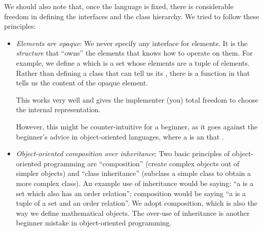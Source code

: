 We should also note that, once the language is fixed, there is considerable freedom in defining the interfaces and the class hierarchy.
We tried to follow these principles:
\begin{itemize}
    \item \emph{Elements are opaque}: We never specify any interface for elements.
          It is the \emph{structure} that ``owns'' the elements that knows how to operate on them.
          For example, we define a  which is a set whose elements are a tuple of elements.
          Rather than defining a class  that can tell us its , there is a function  in  that tells us the content of the opaque element.

          This works very well and gives the implementer (you) total freedom to choose the internal representation.

          However, this might be counter-intuitive for a beginner, as it goes against the beginner's advice in object-oriented languages, where a  is an  that .

    \item \emph{Object-oriented composition over inheritance}:
          Two basic principles of object-oriented programming are ``composition'' (create complex objects out of simpler objects) and ``class inheritance'' (subclass a simple class to obtain a more complex class).
          An example use of inheritance would be saying: ``a  is a set which also has an order relation''; composition would be saying ``a  is a tuple of a set and an order relation''.
          We adopt composition, which is also the way we define mathematical objects.
          The over-use of inheritance is another beginner mistake in object-oriented programming.
\end{itemize}

